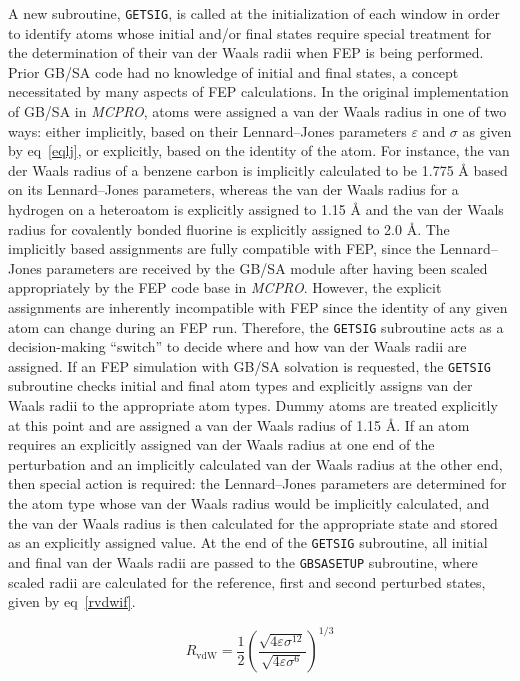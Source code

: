 \documentclass[12pt]{report}
\def\equlab{eq}\def\equslab{Eqs.}
\newcommand*\eq[1]{\equlab~\ref{#1}}
\begin{document}
A new subroutine, {\tt GETSIG}, is called at the initialization of each window in order to identify atoms whose initial and/or final states require special treatment for the determination of their van der Waals radii when FEP is being performed. Prior GB/SA code had no knowledge of initial and final states, a concept necessitated by many aspects of FEP calculations. In the original implementation of GB/SA in \textit{MCPRO}, atoms were assigned a van der Waals radius in one of two ways: either implicitly, based on their Lennard--Jones parameters $\varepsilon$ and $\sigma$ as given by \eq{eqlj}, or explicitly, based on the identity of the atom. For instance, the van der Waals radius of a benzene carbon is implicitly calculated to be 1.775 \AA{} based on its Lennard--Jones parameters, whereas the van der Waals radius for a hydrogen on a heteroatom is explicitly assigned to 1.15 \AA{} and the van der Waals radius for covalently bonded fluorine is explicitly assigned to 2.0 \AA. The implicitly based assignments are fully compatible with FEP, since the Lennard--Jones parameters are received by the GB/SA module after having been scaled appropriately by the FEP code base in \textit{MCPRO}\@. However, the explicit assignments are inherently incompatible with FEP since the identity of any given atom can change during an FEP run. Therefore, the {\tt GETSIG} subroutine acts as a decision-making ``switch'' to decide where and how van der Waals radii are assigned. If an FEP simulation with GB/SA solvation is requested, the {\tt GETSIG} subroutine checks initial and final atom types and explicitly assigns van der Waals radii to the appropriate atom types. Dummy atoms are treated explicitly at this point and are assigned a van der Waals radius of 1.15 \AA. If an atom requires an explicitly assigned van der Waals radius at one end of the perturbation and an implicitly calculated van der Waals radius at the other end, then special action is required: the Lennard--Jones parameters are determined for the atom type whose van der Waals radius would be implicitly calculated, and the van der Waals radius is then calculated for the appropriate state and stored as an explicitly assigned value. At the end of the {\tt GETSIG} subroutine, all initial and final van der Waals radii are passed to the {\tt GBSASETUP} subroutine, where scaled radii are calculated for the reference, first and second perturbed states, given by \eq{rvdwif}.

\vspace*{-.3cm}
\begin{equation}
\label{eqlj}
R_{ \textrm{vdW}} = \frac{1}{2} \left( \frac{\sqrt{4 \varepsilon \sigma^{12}}}{\sqrt{4 \varepsilon \sigma^{6}}} \right)^{1/3}
\end{equation}
\vspace*{-.5cm}
\end{document}

